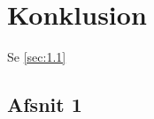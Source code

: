 \chapter{Konklusion}
\label{Ch:6}

Se \vref{sec:1.1}

\lipsum*

\section{Afsnit 1}
\label{sec:1.1}

\lipsum*